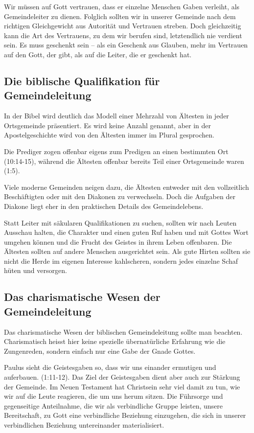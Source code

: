 \documentclass{../../inc/mybib}
\begin{document}
Wir müssen auf Gott vertrauen, dass er einzelne Menschen Gaben verleiht, als Gemeindeleiter zu dienen. Folglich sollten wir in unserer Gemeinde nach dem richtigen Gleichgewicht aus Autorität und Vertrauen streben. Doch gleichzeitig kann die Art des Vertrauens, zu dem wir berufen sind, letztendlich nie verdient sein. Es muss geschenkt sein -- als ein Geschenk aus Glauben, mehr im Vertrauen auf den Gott, der gibt, als auf die Leiter, die er geschenkt hat. 

\subsection{Die biblische Qualifikation für Gemeindeleitung}
In der Bibel wird deutlich das Modell einer Mehrzahl von Ältesten in jeder Ortsgemeinde präsentiert. Es wird keine Anzahl genannt, aber in der Apostelgeschichte wird von den Ältesten immer im Plural gesprochen.

Die Prediger zogen offenbar eigens zum Predigen an einen bestimmten Ort (10:14-15), während die Ältesten offenbar bereits Teil einer Ortsgemeinde waren (1:5).

Viele moderne Gemeinden neigen dazu, die Ältesten entweder mit den vollzeitlich Beschäftigten oder mit den Diakonen zu verwechseln. Doch die Aufgaben der Diakone liegt eher in den praktischen Details des Gemeindelebens.

Statt Leiter mit säkularen Qualifikationen zu suchen, sollten wir nach Leuten Ausschau halten, die Charakter und einen guten Ruf haben und mit Gottes Wort umgehen können und die Frucht des Geistes in ihrem Leben offenbaren. Die Ältesten sollten auf andere Menschen ausgerichtet sein. Als gute Hirten sollten sie nicht die Herde im eigenen Interesse kahlscheren, sondern jedes einzelne Schaf hüten und versorgen.

\subsection{Das charismatische Wesen der Gemeindeleitung}
Das charismatische Wesen der biblischen Gemeindeleitung sollte man beachten. Charismatisch heisst hier keine spezielle übernatürliche Erfahrung wie die Zungenreden, sondern einfach nur eine Gabe der Gnade Gottes.

Paulus sieht die Geistesgaben so, dass wir uns einander ermutigen und auferbauen. (1:11-12). Das Ziel der Geistesgaben dient aber auch zur Stärkung der Gemeinde. Im Neuen Testament hat Christsein sehr viel damit zu tun, wie wir auf die Leute reagieren, die um uns herum sitzen. Die Führsorge und gegenseitige Anteilnahme, die wir als verbindliche Gruppe leisten, unsere Bereitschaft, zu Gott eine verbindliche Beziehung einzugehen, die sich in unserer verbindlichen Beziehung untereinander materialisiert.
\end{document}
